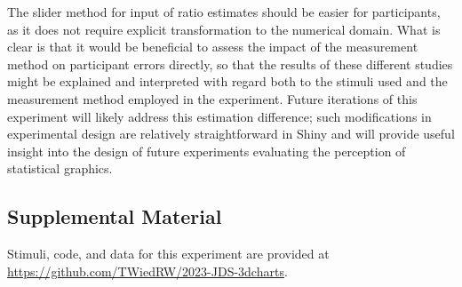 \documentclass[letterpaper,inpress,dvipsnames]{jdsart}
\begin{document}
The slider method for input of ratio estimates should be easier for participants, as it does not require explicit transformation to the numerical domain.
What is clear is that it would be beneficial to assess the impact of the measurement method on participant errors directly, so that the results of these different studies might be explained and interpreted with regard both to the stimuli used and the measurement method employed in the experiment.
Future iterations of this experiment will likely address this estimation difference; such modifications in experimental design are relatively straightforward in Shiny and will provide useful insight into the design of future experiments evaluating the perception of statistical graphics.

\hypertarget{supplemental-material}{%
\subsection{Supplemental Material}\label{supplemental-material}}

Stimuli, code, and data for this experiment are provided at \url{https://github.com/TWiedRW/2023-JDS-3dcharts}.



\end{document}
